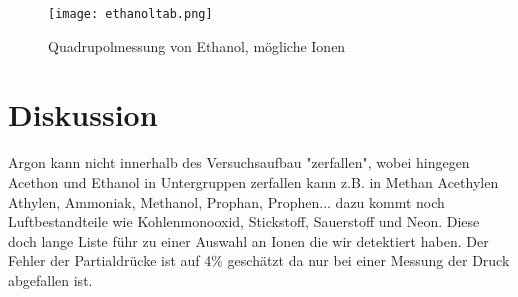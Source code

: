\documentclass[10pt,a4paper]{article}
\begin{document}
\begin{figure}[h]
	\texttt{[image: ethanoltab.png]}
	\centering
	\caption{Quadrupolmessung von Ethanol, mögliche Ionen}
	\label{ethatab}
\end{figure}

\section{Diskussion}

Argon kann nicht innerhalb des Versuchsaufbau "zerfallen", wobei hingegen Acethon und Ethanol in Untergruppen zerfallen kann z.B. in Methan Acethylen Athylen, Ammoniak, Methanol, Prophan, Prophen... dazu kommt noch Luftbestandteile wie Kohlenmonooxid, Stickstoff, Sauerstoff und Neon. Diese doch lange Liste führ zu einer Auswahl an Ionen die wir detektiert haben. Der Fehler der Partialdrücke ist auf 4\% geschätzt da nur bei einer Messung der Druck abgefallen ist.
\end{document}
